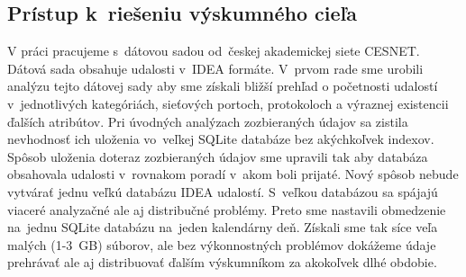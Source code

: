 \documentclass[thesismargins, thesislinespacing, openright, upjsfrontpage]{rnthesis}
\begin{document}

\subsection{Prístup k~riešeniu výskumného cieľa} \label{c1_metodologia}

V práci pracujeme s~dátovou sadou od~českej akademickej siete CESNET. Dátová sada obsahuje udalosti v~IDEA formáte. V~prvom rade sme urobili analýzu tejto dátovej sady aby sme získali bližší prehľad o početnosti udalostí v~jednotlivých kategóriách, sieťových portoch, protokoloch a výraznej existencii ďalších atribútov. Pri úvodných analýzach zozbieraných údajov sa zistila nevhodnosť ich uloženia vo~veľkej SQLite databáze bez akýchkoľvek indexov. Spôsob uloženia doteraz zozbieraných údajov sme upravili tak aby databáza obsahovala udalosti v~rovnakom poradí v~akom boli prijaté. Nový spôsob nebude vytvárať jednu veľkú databázu IDEA udalostí. S~veľkou databázou sa spájajú viaceré analyzačné ale aj distribučné problémy. Preto sme nastavili obmedzenie na~jednu SQLite databázu na~jeden kalendárny deň. Získali sme tak síce veľa malých (1-3~GB) súborov, ale bez výkonnostných problémov dokážeme údaje prehrávať ale aj distribuovať ďalším výskumníkom za akokoľvek dlhé obdobie. 
\end{document}

